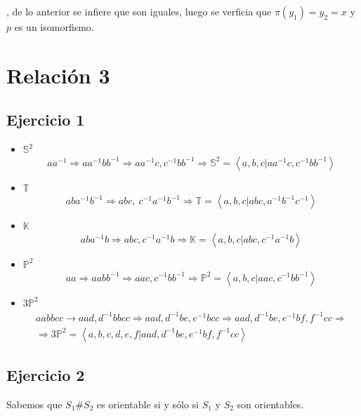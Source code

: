 \documentclass{article}
\begin{document}
, de lo anterior se infiere que son iguales, luego se verficia que $\pi(y_1)=y_2=x$ y $p$ es un isomorfismo. 

\section{Relación 3}
\subsection{Ejercicio 1}
\begin{itemize}
\item $\mathbb{S}^2$
\begin{equation*}
aa^{-1}\Rightarrow aa^{-1}bb^{-1}\Rightarrow aa^{-1}c,c^{-1}bb^{-1}\Rightarrow \mathbb{S}^2=\left\langle a,b,c|aa^{-1}c,c^{-1}bb^{-1}\right\rangle
\end{equation*}

\item $\mathbb{T}$
\begin{equation*}
aba^{-1}b^{-1}\Rightarrow abc,\:c^{-1}a^{-1}b^{-1}\Rightarrow \mathbb{T}=\left\langle a,b,c|abc, a^{-1}b^{-1}c^{-1}\right\rangle
\end{equation*}

\item $\mathbb{K}$
\begin{equation*}
aba^{-1}b\Rightarrow abc, c^{-1}a^{-1}b\Rightarrow \mathbb{K}=\left\langle a,b,c|abc,c^{-1}a^{-1}b\right\rangle
\end{equation*}

\item $\mathbb{P}^2$
\begin{equation*}
aa\Rightarrow aabb^{-1}\Rightarrow aac, c^{-1}bb^{-1}\Rightarrow \mathbb{P}^2=\left\langle a,b,c|aac, c^{-1}bb^{-1}\right\rangle
\end{equation*}

\item $3\mathbb{P}^2$
\begin{gather*}
aabbcc\rightarrow aad, d^{-1}bbcc\Rightarrow aad, d^{-1}be, e^{-1}bcc\Rightarrow aad, d^{-1}be,e^{-1}bf, f^{-1}cc \Rightarrow\\
\Rightarrow 3\mathbb{P}^2=\left\langle a,b,c,d,e,f| aad, d^{-1}be, e^{-1}bf, f^{-1}cc\right\rangle
\end{gather*}
\end{itemize}

\subsection{Ejercicio 2}
Sabemos que $S_1\#S_2$ es orientable si y sólo si $S_1$ y $S_2$ son orientables.
\end{document}
